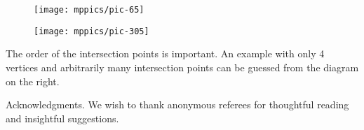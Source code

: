 \documentclass{article}
\theoremstyle{theorem}
\theoremstyle{definition}
\begin{document}
\begin{figure}[!ht]
\begin{minipage}{.48\textwidth}
\centering
\texttt{[image: mppics/pic-65]}
\end{minipage}\hfill
\begin{minipage}{.48\textwidth}
\centering
\texttt{[image: mppics/pic-305]}
\end{minipage}
\end{figure}

The order of the intersection points is important. 
An example with only 4 vertices and arbitrarily many intersection points can be guessed from the diagram on the right.

\begin{acknowledgment}{Acknowledgments.}
We wish to thank anonymous referees for thoughtful reading and insightful suggestions.
\end{acknowledgment}
\end{document}
